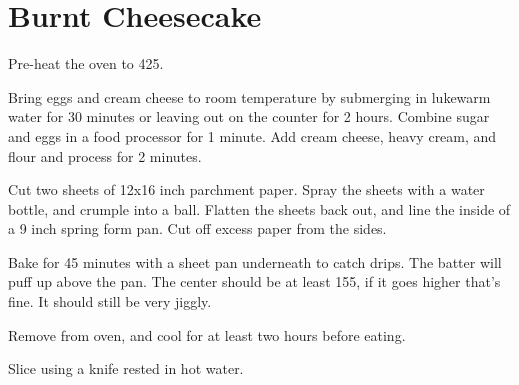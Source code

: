 \section{Burnt Cheesecake}
\begin{recipe}


Pre-heat the oven to 425\degree{}. 


Bring eggs and cream cheese to room temperature by submerging in lukewarm water for 30 minutes or leaving out on the counter for 2 hours. Combine sugar and eggs
in a food processor for 1 minute. Add cream cheese, heavy cream, and flour and process for 2 minutes. 

Cut two sheets of 12x16 inch parchment paper. Spray the sheets with a water bottle, and crumple into a ball. 
Flatten the sheets back out, and line the inside of a 9 inch spring form pan. Cut off excess paper from the sides. 

Bake for 45 minutes with a sheet pan underneath to catch drips. The batter will puff up above the pan. The center should be at least 155\degree, if it goes 
higher that's fine. It should still be very jiggly. 

Remove from oven, and cool for at least two hours before eating.

Slice using a knife rested in hot water. 

\end{recipe}
